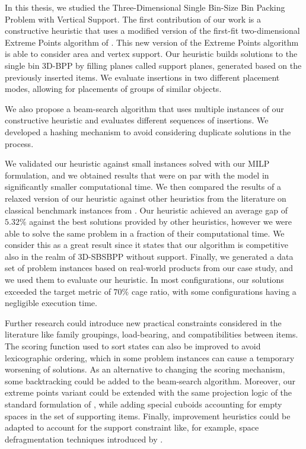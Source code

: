 In this thesis, we studied the Three-Dimensional Single Bin-Size Bin Packing Problem with Vertical Support.
The first contribution of our work is a constructive heuristic that uses a modified version of the first-fit two-dimensional Extreme Points algorithm of \citet{crainic2008extreme}. This new version of the Extreme Points algorithm is able to consider area and vertex support.
Our heuristic builds solutions to the single bin 3D-BPP by filling planes called support planes, generated based on the previously inserted items.
We evaluate insertions in two different placement modes, allowing for placements of groups of similar objects.

We also propose a beam-search algorithm that uses multiple instances of our constructive heuristic and evaluates different sequences of insertions. We developed a hashing mechanism to avoid considering duplicate solutions in the process.

We validated our heuristic against small instances solved with our MILP formulation, and we obtained results that were on par with the model in significantly smaller computational time.
We then compared the results of a relaxed version of our heuristic against other heuristics from the literature on classical benchmark instances from \citet{martello2000three}.
Our heuristic achieved an average gap of $5.32\%$ against the best solutions provided by other heuristics, however we were able to solve the same problem in a fraction of their computational time. We consider this as a great result since it states that our algorithm is competitive also in the realm of 3D-SBSBPP without support.
Finally, we generated a data set of problem instances based on real-world products from our case study, and we used them to evaluate our heuristic. In most configurations, our solutions exceeded the target metric of $70\%$ cage ratio, with some configurations having a negligible execution time.

Further research could introduce new practical constraints considered in the literature like family groupings, load-bearing, and compatibilities between items.
The scoring function used to sort states can also be improved to avoid lexicographic ordering, which in some problem instances can cause a temporary worsening of solutions.
As an alternative to changing the scoring mechanism, some backtracking could be added to the beam-search algorithm.
Moreover, our extreme points variant could be extended with the same projection logic of the standard formulation of \citet{crainic2008extreme}, while adding special cuboids accounting for empty spaces in the set of supporting items.
Finally, improvement heuristics could be adapted to account for the support constraint like, for example, space defragmentation techniques introduced by \cite{ZHU2012452}.